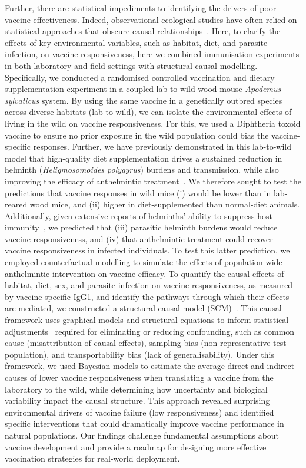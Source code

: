 \documentclass[a4paper, hidelinks, 11pt]{article}
\begin{document}
Further, there are statistical impediments to identifying the drivers of poor vaccine effectiveness. Indeed, observational ecological studies have often relied on statistical approaches that obscure causal relationships~\cite{Franks2025}. Here, to clarify the effects of key environmental variables, such as habitat, diet, and parasite infection, on vaccine responsiveness, here we combined  immunisation experiments in both laboratory and field settings with structural causal modelling. Specifically, we conducted a randomised controlled vaccination and dietary supplementation experiment in a coupled lab-to-wild wood mouse \textit{Apodemus sylvaticus} system. By using the same vaccine in a genetically outbred species across diverse habitats (lab-to-wild), we can isolate the environmental effects of living in the wild on vaccine responsiveness. For this, we used a Diphtheria toxoid vaccine to ensure no prior exposure in the wild population could bias the vaccine-specific responses. Further, we have previously demonstrated in this lab-to-wild model that high-quality diet supplementation drives a sustained reduction in helminth (\textit{Heligmosomoides polygyrus}) burdens and transmission, while also improving the efficacy of anthelmintic treatment~\cite{Sweeny2021}. We therefore sought to test the predictions that vaccine responses in wild mice (i) would be lower than in lab-reared wood mice, and (ii) higher in diet-supplemented than normal-diet animals. Additionally, given extensive reports of helminths' ability to suppress host immunity~\cite{Maizels2003}, we predicted that (iii) parasitic helminth burdens would reduce vaccine responsiveness, and (iv) that anthelmintic treatment could recover vaccine responsiveness in infected individuals. To test this latter prediction, we employed counterfactual modelling to simulate the effects of population-wide anthelmintic intervention on vaccine efficacy. To quantify the causal effects of habitat, diet, sex, and parasite infection on vaccine responsiveness, as measured by vaccine-specific IgG1, and identify the pathways through which their effects are mediated, we constructed a structural causal model (SCM)~\cite{Pearl2009b}. This causal framework uses graphical models and structural equations to inform statistical adjustments~\cite{Glymour2019, Bareinboim2022} required for eliminating or reducing confounding, such as common cause (misattribution of causal effects), sampling bias (non-representative test population), and transportability bias (lack of generalisability). Under this framework, we used Bayesian models to estimate the average direct and indirect causes of lower vaccine responsiveness when translating a vaccine from the laboratory to the wild, while determining how uncertainty and biological variability impact the causal structure. This approach revealed surprising environmental drivers of vaccine failure (low responsiveness) and identified specific interventions that could dramatically improve vaccine performance in natural populations. Our findings challenge fundamental assumptions about vaccine development and provide a roadmap for designing more effective vaccination strategies for real-world deployment.
\end{document}
